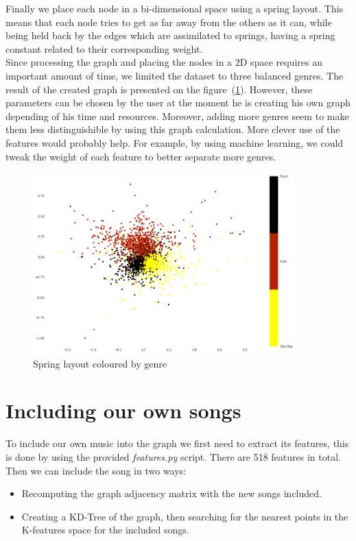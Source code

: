 \documentclass[11pt,a4paper,twoside]{article}
\begin{document}
Finally we place each node in a bi-dimensional space using a spring layout. This means that each node tries to get as far away from the others as it can, while being held back by the edges which are assimilated to springs, having a spring constant related to their corresponding weight.\\

Since processing the graph and placing the nodes in a 2D space requires an important amount of time, we limited the dataset to three balanced genres. The result of the created graph is presented on the figure~(\ref{fig:spring_layout}). However, these parameters can be chosen by the user at the moment he is creating his own graph depending of his time and resources. Moreover, adding more genres seem to make them less distinguishible by using this graph calculation. More clever use of the features would probably help. For example, by using machine learning, we could tweak the weight of each feature to better separate more genres.

\begin{figure}[H]
\centering
\includegraphics[width=0.9\textwidth] {./Figures/graph_2}
\caption{Spring layout coloured by genre}
\label{fig:spring_layout}
\end{figure}
\section{Including our own songs}

To include our own music into the graph we first need to extract its features, this is done by using
the provided \textit{features.py} script\cite{fma_dataset}. There are 518 features in total.
Then we can include the song in two ways:
\begin{itemize}
\item Recomputing the graph adjacency matrix with the new songs included.

\item Creating a KD-Tree of the graph, then searching for the nearest points in the K-features space for the included songs.
\end{itemize}
\end{document}
